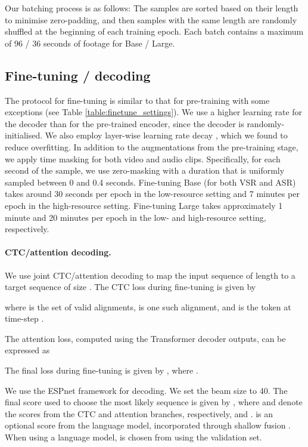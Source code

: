 \documentclass{article} \usepackage{iclr2023_conference,times}
\begin{document}
Our batching process is as follows: The samples are sorted based on their length to minimise zero-padding, and then samples with the same length are randomly shuffled at the beginning of each training epoch. Each batch contains a maximum of 96 / 36 seconds of footage for Base / Large.

\subsection{Fine-tuning / decoding} \label{sec:finetune}
The protocol for fine-tuning is similar to that for pre-training with some exceptions (see Table \ref{table:finetune_settings}). We use a higher learning rate for the decoder than for the pre-trained encoder, since the decoder is randomly-initialised. We also employ layer-wise learning rate decay \citep{clark2020electra}, which we found to reduce overfitting. In addition to the augmentations from the pre-training stage, we apply time masking \citep{ma2022visual} for both video and audio clips. Specifically, for each second of the sample, we use zero-masking with a duration that is uniformly sampled between 0 and 0.4 seconds. Fine-tuning Base (for both VSR and ASR) takes around 30 seconds per epoch in the low-resource setting and 7 minutes per epoch in the high-resource setting. Fine-tuning Large takes approximately 1 minute and 20 minutes per epoch in the low- and high-resource setting, respectively.

\paragraph{CTC/attention decoding.} We use joint CTC/attention decoding to map the input sequence  of length  to a target sequence  of size . The CTC loss during fine-tuning is given by

where  is the set of valid alignments,  is one such alignment, and  is the token at time-step .

The attention loss, computed using the Transformer decoder outputs, can be expressed as


The final loss during fine-tuning is given by , where .

We use the ESPnet framework \citep{watanabe2018espnet} for decoding. We set the beam size to 40. The final score used to choose the most likely sequence is given by , where  and  denote the scores from the CTC and attention branches, respectively, and .  is an optional score from the language model, incorporated through shallow fusion \citep{watanabe2017hybrid}. When using a language model,  is chosen from  using the validation set.
\end{document}
